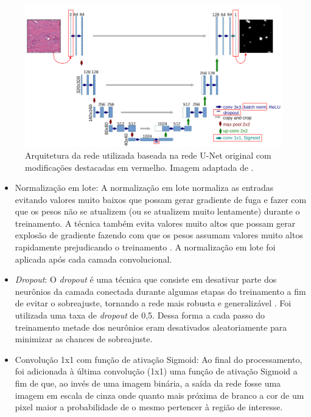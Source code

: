 \begin{figure}[H]
  \centering
  \includegraphics[width=.9\linewidth]{figures/3_methods/unet.png}
  \caption[Arquitetura da rede utilizada]{Arquitetura da rede utilizada baseada na rede U-Net original com modificações destacadas em vermelho. Imagem adaptada de \cite{santos2022automated}.}
  \label{fig:dali-unet}
\end{figure}

 \begin{itemize}
   \item Normalização em lote: A normalização em lote normaliza as entradas evitando valores muito baixos que possam gerar gradiente de fuga e fazer com que os pesos não se atualizem (ou se atualizem muito lentamente) durante o treinamento. A técnica também evita valores muito altos que possam gerar explosão de gradiente fazendo com que os pesos assumam valores muito altos rapidamente prejudicando o treinamento \cite{geron2019maos}. A normalização em lote foi aplicada após cada camada convolucional.
   \item \textit{Dropout}: O \textit{dropout} é uma técnica que consiste em desativar parte dos neurônios da camada conectada durante algumas etapas do treinamento a fim de evitar o sobreajuste, tornando a rede mais robusta e generalizável \cite{geron2019maos}. Foi utilizada uma taxa de \textit{dropout} de 0,5. Dessa forma a cada passo do treinamento metade dos neurônios eram desativados aleatoriamente para minimizar as chances de sobreajuste.
   \item Convolução 1x1 com função de ativação Sigmoid: Ao final do processamento, foi adicionada à última convolução (1x1) uma função de ativação Sigmoid a fim de que, ao invés de uma imagem binária, a saída da rede fosse uma imagem em escala de cinza onde quanto mais próxima de branco a cor de um pixel maior a probabilidade de o mesmo pertencer à região de interesse.
 \end{itemize}



